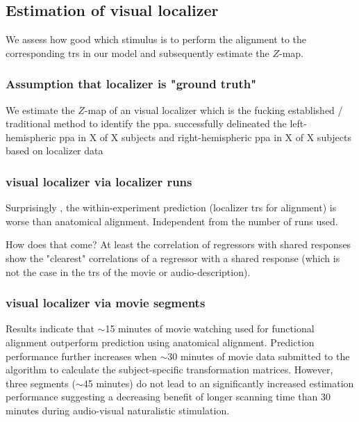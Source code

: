 \subsection{Estimation of visual localizer}

We assess how good which stimulus is to perform the alignment to the
corresponding \acp{tr} in our model and subsequently estimate the $Z$-map.


\subsubsection{Assumption that localizer is "ground truth"}

We estimate the $Z$-map of an visual localizer which is the fucking established
/ traditional method to identify the \ac{ppa}.
%
\citet{sengupta2016extension} successfully delineated the left-hemispheric
\ac{ppa} in X of X subjects and right-hemispheric \ac{ppa} in X of X subjects
based on localizer data


\subsubsection{visual localizer via localizer runs}


Surprisingly \citep[cf.][]{haxby2011common}, the within-experiment prediction
(localizer \acp{tr} for alignment) is worse than anatomical alignment.
%
Independent from the number of runs used.
%

How does that come? At least the correlation of regressors with shared responses
show the "clearest" correlations of a regressor with a shared response (which is
not the case in the \acp{tr} of the movie or audio-description).


\subsubsection{visual localizer via movie segments}

%
Results indicate that $\sim$15 minutes of movie watching used for functional
alignment outperform prediction using anatomical alignment.
%
Prediction performance further increases when $\sim$30 minutes of movie data
submitted to the algorithm to calculate the subject-specific transformation
matrices.
%
However, three segments ($\sim$45 minutes) do not lead to an significantly
increased estimation performance suggesting a decreasing benefit of longer
scanning time than 30 minutes during audio-visual naturalistic stimulation.


